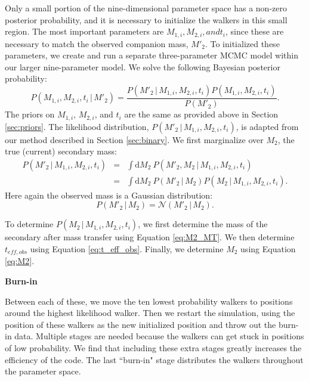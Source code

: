 \documentclass[12pt, preprint]{aastex}
\newcommand{\given}{\,|\,}
\newcommand{\dd}{\mathrm{d}}
\begin{document}
Only a small portion of the nine-dimensional parameter space has a non-zero posterior probability, and it is necessary to initialize the walkers in this small region. The most important parameters are $M_{1,i}, M_{2,i}, and t_i$, since these are necessary to match the observed companion mass, $M'_2$. To initialized these parameters, we create and run a separate three-parameter MCMC model within our larger nine-parameter model. We solve the following Bayesian posterior probability:
\begin{equation}
P(M_{1,i}, M_{2,i}, t_i \given M'_2) = \frac{ P(M'_2 \given M_{1,i}, M_{2,i}, t_i ) P( M_{1,i}, M_{2,i}, t_i )}{P(M'_2)}.
\end{equation}
The priors on $M_{1,i}$, $M_{2,i}$, and $t_i$ are the same as provided above in Section \ref{sec:priors}. The likelihood distribution, $P(M'_2 \given M_{1,i}, M_{2,i}, t_i )$, is adapted from our method described in Section \ref{sec:binary}. We first marginalize over $M_2$, the true (current) secondary mass:
\begin{eqnarray}
P(M'_2 \given M_{1,i}, M_{2,i}, t_i ) &=& \int \dd M_2\ P(M'_2, M_2 \given M_{1,i}, M_{2,i}, t_i ) \nonumber \\
&=& \int \dd M_2\ P(M'_2 \given M_2) P(M_2 \given M_{1,i}, M_{2,i}, t_i).
\end{eqnarray}
Here again the observed mass is a Gaussian distribution: 
\begin{equation}
P(M'_2 \given M_2) = \mathcal{N}(M'_2 \given M_2).
\end{equation}

To determine $P(M_2 \given M_{1,i}, M_{2,i}, t_i )$, we first determine the mass of the secondary after mass transfer using Equation \ref{eq:M2_MT}. We then determine $t_{eff,obs}$ using Equation \ref{eq:t_eff_obs}. Finally, we determine $M_2$ using Equation \ref{eq:M2}.




{\bf Burn-in}


Between each of these, we move the ten lowest probability walkers to positions around the highest likelihood walker. Then we restart the simulation, using the position of these walkers as the new initialized position and throw out the burn-in data. Multiple stages are needed because the walkers can get stuck in positions of low probability. We find that including these extra stages greatly increases the efficiency of the code. The last ``burn-in" stage distributes the walkers throughout the parameter space. 
\end{document}
